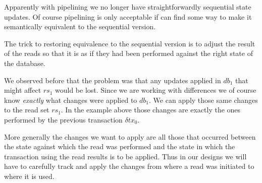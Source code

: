 \documentclass[11pt,a4paper]{article}
\begin{document}
Apparently with pipelining we no longer have straightforwardly sequential state
updates. Of course pipelining is only acceptable if can find some way to make
it semantically equivalent to the sequential version.

\begin{center}
\end{center}
The trick to restoring equivalence to the sequential version is to adjust the
result of the reads so that it is as if they had been performed against the
right state of the database.

We observed before that the problem was that any updates applied in
$\mathit{db}_1$ that might affect $\mathit{rs}_1$ would be lost. Since we are
working with differences we of course know \emph{exactly} what changes were
applied to $\mathit{db}_1$. We can apply those same changes to the read set
$\mathit{rs}_1$. In the example above those changes are exactly the ones
performed by the previous transaction $\delta\mathit{tx}_0$.

More generally the changes we want to apply are all those that occurred between
the state against which the read was performed and the state in which the
transaction using the read results is to be applied. Thus in our designs we
will have to carefully track and apply the changes from where a read was
initiated to where it is used.
\end{document}
